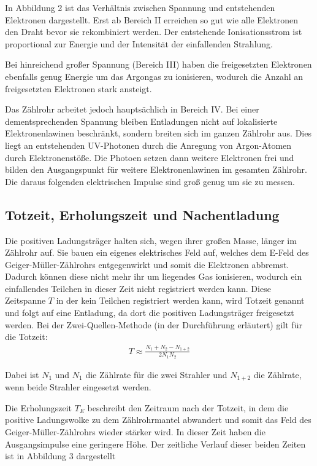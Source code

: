  In Abbildung 2 ist das Verhältnis zwischen Spannung und entstehenden Elektronen dargestellt. Erst ab Bereich II
erreichen so gut wie alle Elektronen den Draht bevor sie rekombiniert werden. Der entstehende Ionisationsstrom ist
proportional zur Energie und der Intensität der einfallenden Strahlung.

Bei hinreichend großer Spannung (Bereich III) haben die freigesetzten Elektronen ebenfalls genug Energie um das Argongas zu ionisieren,
wodurch die Anzahl an freigesetzten Elektronen stark ansteigt.

Das Zählrohr arbeitet jedoch hauptsächlich in Bereich IV. Bei einer dementsprechenden Spannung bleiben Entladungen nicht
auf lokalisierte Elektronenlawinen beschränkt, sondern breiten sich im ganzen Zählrohr aus. Dies liegt
an entstehenden UV-Photonen durch die Anregung von Argon-Atomen durch Elektronenstöße. Die Photoen setzen dann weitere Elektronen frei und
bilden den Ausgangspunkt für weitere Elektronenlawinen im gesamten Zählrohr.
Die daraus folgenden elektrischen Impulse sind groß genug um sie zu messen.

\subsection{Totzeit, Erholungszeit und Nachentladung}

Die positiven Ladungsträger halten sich, wegen ihrer großen Masse, länger im Zählrohr auf. Sie bauen ein eigenes
elektrisches Feld auf, welches dem E-Feld des Geiger-Müller-Zählrohrs entgegenwirkt und somit die Elektronen abbremst.
Dadurch können diese nicht mehr ihr um liegendes Gas ionisieren, wodurch ein einfallendes Teilchen in dieser Zeit
nicht registriert werden kann. Diese Zeitspanne $T$ in der kein Teilchen registriert werden kann, wird Totzeit genannt
und folgt auf eine Entladung, da dort die positiven Ladungsträger freigesetzt werden.
Bei der Zwei-Quellen-Methode (in der Durchführung erläutert) gilt für die Totzeit:
\begin{align}
  T \approx \frac{N_1 + N_2- N_{1+2}}{2 N_1 N_2}
\end{align}

Dabei ist $N_1$ und $N_1$ die Zählrate für die zwei Strahler und $N_{1+2}$ die Zählrate,
wenn beide Strahler eingesetzt werden.

Die Erholungszeit $T_E$ beschreibt den Zeitraum nach der Totzeit, in dem die positive Ladungswolke zu dem Zählrohrmantel abwandert und somit
das Feld des Geiger-Müller-Zählrohrs wieder stärker wird. In dieser Zeit haben die Ausgangsimpulse eine geringere Höhe. Der zeitliche Verlauf
dieser beiden Zeiten ist in Abbildung 3 dargestellt


